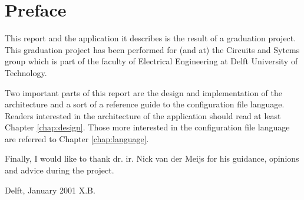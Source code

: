 
\chapter*{Preface}
\label{chap:preface}

This report and the application it describes is the result of a graduation
project. This graduation project has been performed for (and at) the Circuits
and Sytems group which is part of the faculty of Electrical Engineering at
Delft University of Technology.

Two important parts of this report are the design and implementation of the
architecture and a sort of a reference guide to the configuration file
language. Readers interested in the architecture of the application should read
at least Chapter \ref{chap:design}. Those more interested in the configuration
file language are referred to Chapter \ref{chap:language}.

Finally, I would like to thank dr. ir. Nick van der Meijs for his guidance,
opinions and advice during the project.

\bigskip \bigskip \noindent
Delft, January 2001 \hfill X.B.
